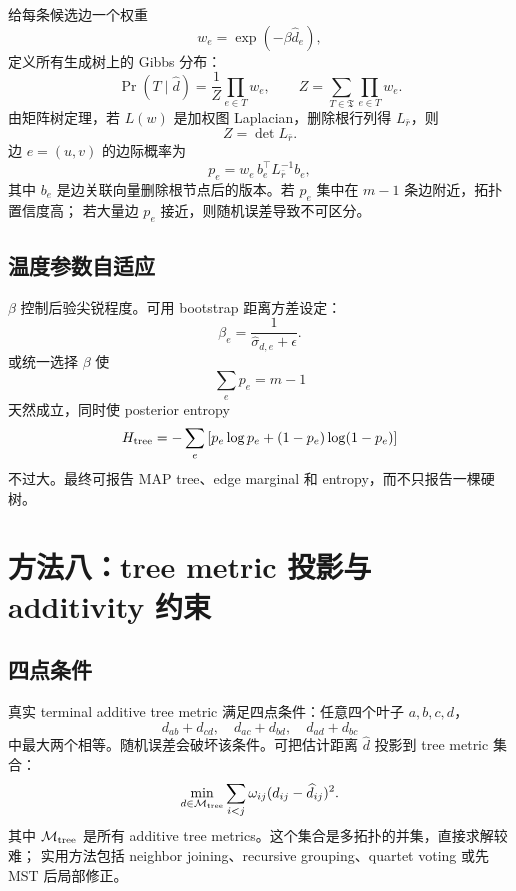 \documentclass[UTF8,11pt]{ctexart}
\begin{document}
给每条候选边一个权重
\[
    w_e=\exp(-\beta \widehat d_e),
\]
定义所有生成树上的 Gibbs 分布：
\begin{equation}
    \Pr(T\mid \widehat d)
    =
    \frac{1}{Z}
    \prod_{e\in T}w_e,
\qquad
    Z=\sum_{T\in\mathfrak{T}}\prod_{e\in T}w_e.
    \label{eq:tree-posterior}
\end{equation}
由矩阵树定理，若 $L(w)$ 是加权图 Laplacian，删除根行列得 $L_{\bar r}$，则
\[
    Z=\det L_{\bar r}.
\]
边 $e=(u,v)$ 的边际概率为
\begin{equation}
    p_e
    =
    w_e\, b_e^\top L_{\bar r}^{-1} b_e,
    \label{eq:edge-marginal}
\end{equation}
其中 $b_e$ 是边关联向量删除根节点后的版本。若 $p_e$ 集中在 $m-1$ 条边附近，拓扑置信度高；
若大量边 $p_e$ 接近，则随机误差导致不可区分。

\subsection{温度参数自适应}

$\beta$ 控制后验尖锐程度。可用 bootstrap 距离方差设定：
\[
    \beta_e=\frac{1}{\widehat\sigma_{d,e}+\epsilon}.
\]
或统一选择 $\beta$ 使
\[
    \sum_e p_e=m-1
\]
天然成立，同时使 posterior entropy
\[
    H_{\rm tree}
    =
    -\sum_e
    \left[
      p_e\log p_e+(1-p_e)\log(1-p_e)
    \right]
    \label{eq:tree-entropy}
\]
不过大。最终可报告 MAP tree、edge marginal 和 entropy，而不只报告一棵硬树。

\section{方法八：tree metric 投影与 additivity 约束}

\subsection{四点条件}

真实 terminal additive tree metric 满足四点条件：任意四个叶子 $a,b,c,d$，
\[
    d_{ab}+d_{cd},\quad d_{ac}+d_{bd},\quad d_{ad}+d_{bc}
\]
中最大两个相等。随机误差会破坏该条件。可把估计距离 $\widehat d$ 投影到 tree metric 集合：
\begin{equation}
    \min_{d\in\mathcal{M}_{\rm tree}}
    \sum_{i<j}\omega_{ij}(d_{ij}-\widehat d_{ij})^2.
    \label{eq:tree-metric-proj}
\end{equation}
其中 $\mathcal{M}_{\rm tree}$ 是所有 additive tree metrics。这个集合是多拓扑的并集，直接求解较难；
实用方法包括 neighbor joining、recursive grouping、quartet voting 或先 MST 后局部修正。
\end{document}
